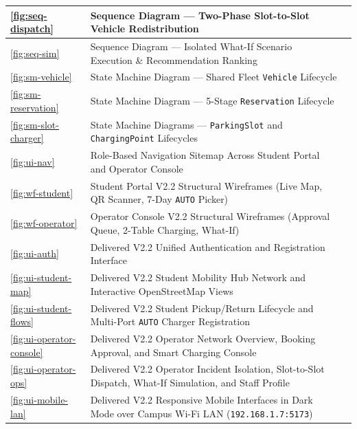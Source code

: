 \documentclass[oneside,final]{hcmut-report}
\begin{document}
{\begin{longtable}[l]{|C{1.5cm}|L{11.85cm}|C{1.32cm}|}
  \hline
  \ref{fig:seq-dispatch} & Sequence Diagram --- Two-Phase Slot-to-Slot Vehicle Redistribution & \pageref{fig:seq-dispatch} \\
  \hline
  \ref{fig:seq-sim} & Sequence Diagram --- Isolated What-If Scenario Execution \& Recommendation Ranking & \pageref{fig:seq-sim} \\
  \hline
  \ref{fig:sm-vehicle} & State Machine Diagram --- Shared Fleet \texttt{Vehicle} Lifecycle & \pageref{fig:sm-vehicle} \\
  \hline
  \ref{fig:sm-reservation} & State Machine Diagram --- 5-Stage \texttt{Reservation} Lifecycle & \pageref{fig:sm-reservation} \\
  \hline
  \ref{fig:sm-slot-charger} & State Machine Diagrams --- \texttt{ParkingSlot} and \texttt{ChargingPoint} Lifecycles & \pageref{fig:sm-slot-charger} \\
  \hline
  \ref{fig:ui-nav} & Role-Based Navigation Sitemap Across Student Portal and Operator Console & \pageref{fig:ui-nav} \\
  \hline
  \ref{fig:wf-student} & Student Portal V2.2 Structural Wireframes (Live Map, QR Scanner, 7-Day \texttt{AUTO} Picker) & \pageref{fig:wf-student} \\
  \hline
  \ref{fig:wf-operator} & Operator Console V2.2 Structural Wireframes (Approval Queue, 2-Table Charging, What-If) & \pageref{fig:wf-operator} \\
  \hline
  \ref{fig:ui-auth} & Delivered V2.2 Unified Authentication and Registration Interface & \pageref{fig:ui-auth} \\
  \hline
  \ref{fig:ui-student-map} & Delivered V2.2 Student Mobility Hub Network and Interactive OpenStreetMap Views & \pageref{fig:ui-student-map} \\
  \hline
  \ref{fig:ui-student-flows} & Delivered V2.2 Student Pickup/Return Lifecycle and Multi-Port \texttt{AUTO} Charger Registration & \pageref{fig:ui-student-flows} \\
  \hline
  \ref{fig:ui-operator-console} & Delivered V2.2 Operator Network Overview, Booking Approval, and Smart Charging Console & \pageref{fig:ui-operator-console} \\
  \hline
  \ref{fig:ui-operator-ops} & Delivered V2.2 Operator Incident Isolation, Slot-to-Slot Dispatch, What-If Simulation, and Staff Profile & \pageref{fig:ui-operator-ops} \\
  \hline
  \ref{fig:ui-mobile-lan} & Delivered V2.2 Responsive Mobile Interfaces in Dark Mode over Campus Wi-Fi LAN (\texttt{192.168.1.7:5173}) & \pageref{fig:ui-mobile-lan} \\

\end{longtable}}
\end{document}
